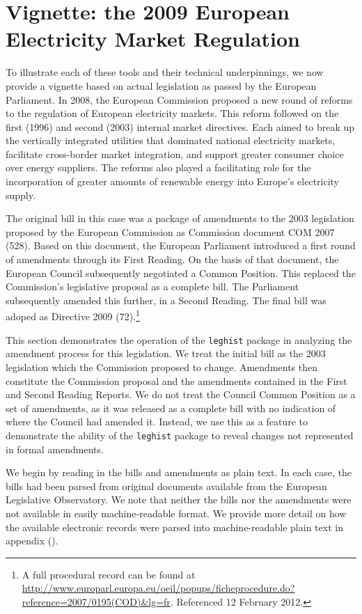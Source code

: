 \documentclass[11pt]{article}
\begin{document}
\section{Vignette: the 2009 European Electricity Market Regulation }
\label{sec:vign-2009-europ}

To illustrate each of these tools and their technical underpinnings,
we now provide a vignette based on actual legislation as passed by the
European Parliament. In 2008, the European Commission proposed a new round of reforms to
the regulation of European electricity markets. This reform followed
on the first (1996) and second (2003) internal market directives. Each
aimed to break up the vertically integrated utilities that dominated
national electricity markets, facilitate cross-border market
integration, and support greater consumer choice over energy
suppliers. The reforms also played a facilitating role for the
incorporation of greater amounts of renewable energy into Europe's
electricity supply. 

The original bill in this case was a package of amendments to the 2003
legislation proposed by the European Commission as Commission document
COM 2007 (528). Based on this document, the European Parliament
introduced a first round of amendments through its First Reading. On
the basis of that document, the European Council subsequently
negotiated a Common Position. This replaced the Commission's
legislative proposal as a complete bill. The Parliament subsequently
amended this further, in a Second Reading. The final bill was
adoped as Directive 2009 (72).\footnote{A full procedural record can
  be found at
  \url{http://www.europarl.europa.eu/oeil/popups/ficheprocedure.do?reference=2007/0195(COD)&lg=fr}. Referenced
12 February 2012.} 

This section demonstrates the operation of the \texttt{leghist}
package in analyzing the amendment process for this legislation. We
treat the initial bill as the 2003 legislation which the Commission
proposed to change. Amendments then constitute the Commission proposal
and the amendments contained in the First and Second Reading
Reports. We do not treat the Council Common Position as a set of
amendments, as it was released as a complete bill with no indication
of where the Council had amended it. Instead, we use this as a feature
to demonstrate the ability of the \texttt{leghist} package to reveal
changes not represented in formal amendments. 

We begin by reading in the bills and amendments as plain text. In each
case, the bills had been parsed from original documents available from
the European Legislative Observatory. We note that neither the bills
nor the amendments were
not available in easily machine-readable format. We provide more
detail on how the available electronic records were parsed into
machine-readable plain text in appendix (). 
\end{document}
